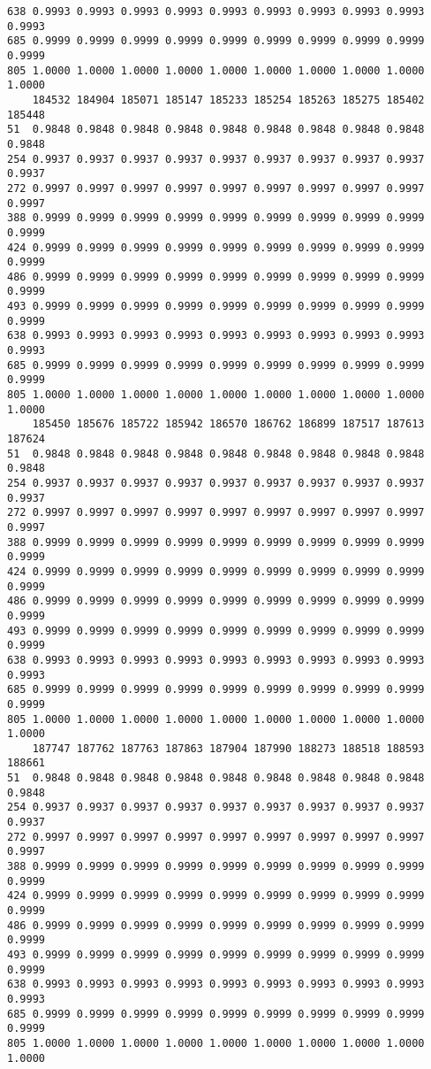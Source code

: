 \documentclass[
]{report}
\begin{document}
\begin{verbatim}
638 0.9993 0.9993 0.9993 0.9993 0.9993 0.9993 0.9993 0.9993 0.9993 0.9993
685 0.9999 0.9999 0.9999 0.9999 0.9999 0.9999 0.9999 0.9999 0.9999 0.9999
805 1.0000 1.0000 1.0000 1.0000 1.0000 1.0000 1.0000 1.0000 1.0000 1.0000
    184532 184904 185071 185147 185233 185254 185263 185275 185402 185448
51  0.9848 0.9848 0.9848 0.9848 0.9848 0.9848 0.9848 0.9848 0.9848 0.9848
254 0.9937 0.9937 0.9937 0.9937 0.9937 0.9937 0.9937 0.9937 0.9937 0.9937
272 0.9997 0.9997 0.9997 0.9997 0.9997 0.9997 0.9997 0.9997 0.9997 0.9997
388 0.9999 0.9999 0.9999 0.9999 0.9999 0.9999 0.9999 0.9999 0.9999 0.9999
424 0.9999 0.9999 0.9999 0.9999 0.9999 0.9999 0.9999 0.9999 0.9999 0.9999
486 0.9999 0.9999 0.9999 0.9999 0.9999 0.9999 0.9999 0.9999 0.9999 0.9999
493 0.9999 0.9999 0.9999 0.9999 0.9999 0.9999 0.9999 0.9999 0.9999 0.9999
638 0.9993 0.9993 0.9993 0.9993 0.9993 0.9993 0.9993 0.9993 0.9993 0.9993
685 0.9999 0.9999 0.9999 0.9999 0.9999 0.9999 0.9999 0.9999 0.9999 0.9999
805 1.0000 1.0000 1.0000 1.0000 1.0000 1.0000 1.0000 1.0000 1.0000 1.0000
    185450 185676 185722 185942 186570 186762 186899 187517 187613 187624
51  0.9848 0.9848 0.9848 0.9848 0.9848 0.9848 0.9848 0.9848 0.9848 0.9848
254 0.9937 0.9937 0.9937 0.9937 0.9937 0.9937 0.9937 0.9937 0.9937 0.9937
272 0.9997 0.9997 0.9997 0.9997 0.9997 0.9997 0.9997 0.9997 0.9997 0.9997
388 0.9999 0.9999 0.9999 0.9999 0.9999 0.9999 0.9999 0.9999 0.9999 0.9999
424 0.9999 0.9999 0.9999 0.9999 0.9999 0.9999 0.9999 0.9999 0.9999 0.9999
486 0.9999 0.9999 0.9999 0.9999 0.9999 0.9999 0.9999 0.9999 0.9999 0.9999
493 0.9999 0.9999 0.9999 0.9999 0.9999 0.9999 0.9999 0.9999 0.9999 0.9999
638 0.9993 0.9993 0.9993 0.9993 0.9993 0.9993 0.9993 0.9993 0.9993 0.9993
685 0.9999 0.9999 0.9999 0.9999 0.9999 0.9999 0.9999 0.9999 0.9999 0.9999
805 1.0000 1.0000 1.0000 1.0000 1.0000 1.0000 1.0000 1.0000 1.0000 1.0000
    187747 187762 187763 187863 187904 187990 188273 188518 188593 188661
51  0.9848 0.9848 0.9848 0.9848 0.9848 0.9848 0.9848 0.9848 0.9848 0.9848
254 0.9937 0.9937 0.9937 0.9937 0.9937 0.9937 0.9937 0.9937 0.9937 0.9937
272 0.9997 0.9997 0.9997 0.9997 0.9997 0.9997 0.9997 0.9997 0.9997 0.9997
388 0.9999 0.9999 0.9999 0.9999 0.9999 0.9999 0.9999 0.9999 0.9999 0.9999
424 0.9999 0.9999 0.9999 0.9999 0.9999 0.9999 0.9999 0.9999 0.9999 0.9999
486 0.9999 0.9999 0.9999 0.9999 0.9999 0.9999 0.9999 0.9999 0.9999 0.9999
493 0.9999 0.9999 0.9999 0.9999 0.9999 0.9999 0.9999 0.9999 0.9999 0.9999
638 0.9993 0.9993 0.9993 0.9993 0.9993 0.9993 0.9993 0.9993 0.9993 0.9993
685 0.9999 0.9999 0.9999 0.9999 0.9999 0.9999 0.9999 0.9999 0.9999 0.9999
805 1.0000 1.0000 1.0000 1.0000 1.0000 1.0000 1.0000 1.0000 1.0000 1.0000

\end{verbatim}
\end{document}
